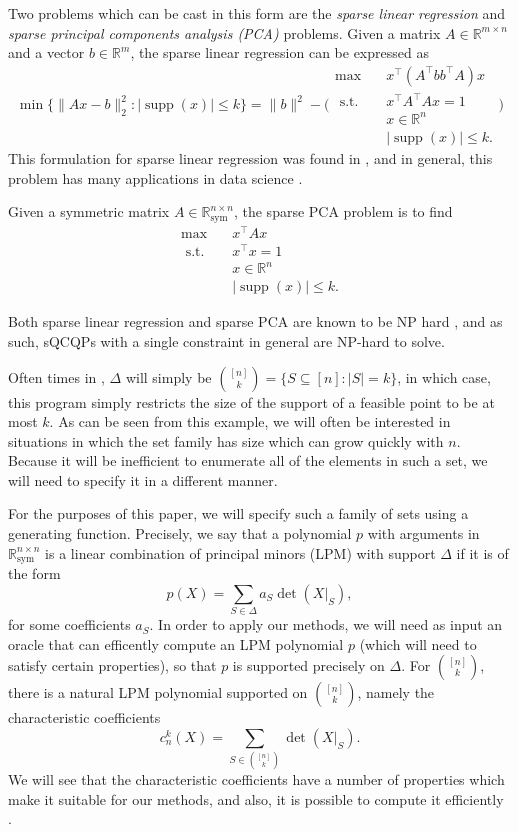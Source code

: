 \documentclass{amsart}
\theoremstyle{definition}
\newcommand{\R}{\mathbb{R}}
\DeclareMathOperator*{\supp}{supp}
\newcommand{\st}{{\text{ s.t. }}}
\newcommand*{\Sym}{\R^{n \times n}_{\mathrm{sym}}}
\begin{document}
Two problems which can be cast in this form are the \emph{sparse linear regression} and \emph{sparse principal components analysis (PCA)} problems.
Given a matrix $A \in \R^{m\times n}$ and a vector $b \in \R^{m}$, the sparse linear regression can be expressed as
\begin{equation}\label{eq:sparse_reg}
    \min \{\|A x - b\|_2^2 : |\supp(x)| \le k\} = \|b\|^2 - \Big(
    \begin{aligned}
        \max\quad & x^{\intercal}(A^{\intercal}bb^{\intercal}A)x\\
        \st & x^{\intercal}A^{\intercal}Ax = 1\\
            & x \in \R^n\\
            &|\supp(x)| \le k.
    \end{aligned}\Big)
\end{equation}
This formulation for sparse linear regression was found in \cite{TODO}, and in general, this problem has many applications in data science \cite{TODO}.

Given a symmetric matrix $A \in \Sym$, the sparse PCA problem is to find
\begin{equation}\label{eq:sparse_reg}
    \begin{aligned}
        \max\quad & x^{\intercal}Ax\\
        \st & x^{\intercal}x = 1\\
            & x \in \R^n\\
            &|\supp(x)| \le k.
    \end{aligned}
\end{equation}

Both sparse linear regression and sparse PCA are known to be NP hard \cite{TODO}, and as such, sQCQPs with a single constraint in general are NP-hard to solve.

Often times in , $\Delta$ will simply be $\binom{[n]}{k} = \{S \subseteq [n] : |S| = k\}$, in which case, this program simply restricts the size of the support of a feasible point to be at most $k$.
As can be seen from this example, we will often be interested in situations in which the set family has size which can grow quickly with $n$.
Because it will be inefficient to enumerate all of the elements in such a set, we will need to specify it in a different manner.

For the purposes of this paper, we will specify such a family of sets using a generating function.
Precisely, we say that a polynomial $p$ with arguments in $\Sym$ is a linear combination of principal minors (LPM) with support $\Delta$ if it is of the form
\[
    p(X) = \sum_{S \in \Delta} a_S\det(X|_S),
\]
for some coefficients $a_S$.
In order to apply our methods, we will need as input an oracle that can efficently compute an LPM polynomial $p$ (which will need to satisfy certain properties), so that $p$ is supported precisely on $\Delta$.
For $\binom{[n]}{k}$, there is a natural LPM polynomial supported on $\binom{[n]}{k}$, namely the characteristic coefficients
\[
    c_n^k(X) = \sum_{S \in \binom{[n]}{k}} \det(X|_S).
\]
We will see that the characteristic coefficients have a number of properties which make it suitable for our methods, and also, it is possible to compute it efficiently \cite{TODO}.
\end{document}
